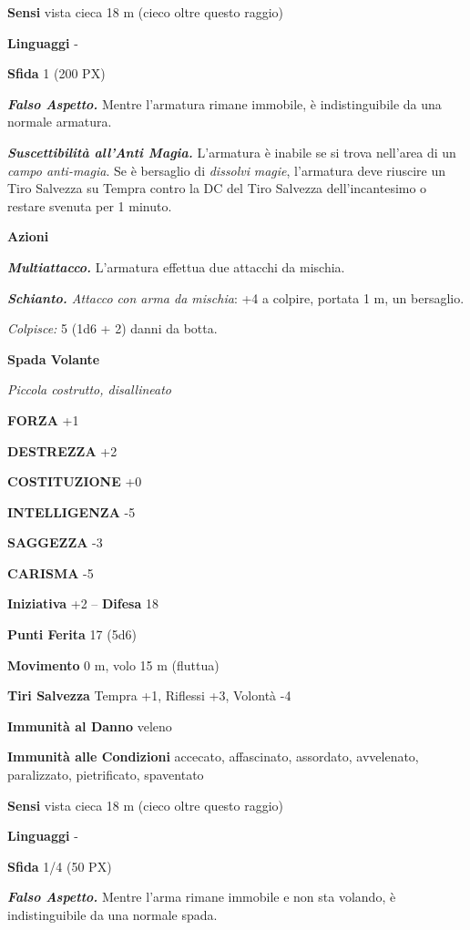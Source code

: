 \begin{multicols}{2}
\textbf{Sensi} vista cieca 18 m (cieco oltre questo raggio)

\textbf{Linguaggi} -

\textbf{Sfida} 1 (200 PX)

\textit{\textbf{Falso Aspetto.}} Mentre l'armatura rimane immobile, è indistinguibile da una normale armatura.

\textit{\textbf{Suscettibilità all'Anti Magia.}} L'armatura è inabile se si trova nell'area di un \textit{campo anti-magia}. Se è bersaglio di \textit{dissolvi} \textit{magie}, l'armatura deve riuscire un Tiro Salvezza su Tempra contro la DC del Tiro Salvezza dell'incantesimo o restare svenuta per 1 minuto.

\textbf{Azioni}

\textit{\textbf{Multiattacco.}} L'armatura effettua due attacchi da mischia.

\textit{\textbf{Schianto.} Attacco con arma da mischia}: +4 a colpire, portata 1 m, un bersaglio.

\textit{Colpisce:} 5 (1d6 + 2) danni da botta.

\medskip{}\textbf{Spada Volante}

\textit{Piccola costrutto, disallineato}

\textbf{FORZA} +1

\textbf{DESTREZZA} +2

\textbf{COSTITUZIONE} +0

\textbf{INTELLIGENZA} -5

\textbf{SAGGEZZA} -3

\textbf{CARISMA} -5

\textbf{Iniziativa} +2 -- \textbf{Difesa} 18

\textbf{Punti Ferita} 17 (5d6)

\textbf{Movimento} 0 m, volo 15 m (fluttua)

\textbf{Tiri Salvezza} Tempra +1, Riflessi +3, Volontà -4

\textbf{Immunità al Danno} veleno

\textbf{Immunità alle Condizioni} accecato, affascinato, assordato, avvelenato, paralizzato, pietrificato, spaventato

\textbf{Sensi} vista cieca 18 m (cieco oltre questo raggio)

\textbf{Linguaggi} -

\textbf{Sfida} 1/4 (50 PX)

\textit{\textbf{Falso Aspetto.}} Mentre l'arma rimane immobile e non sta volando, è indistinguibile da una normale spada.


\end{multicols}
